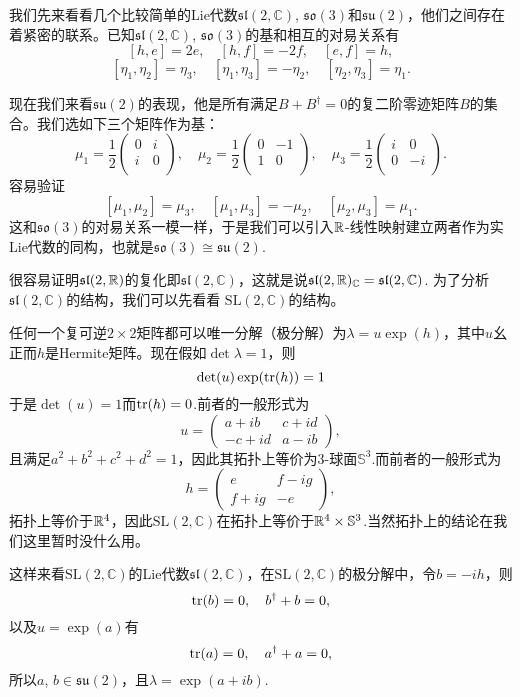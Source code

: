 \documentclass[9pt]{extarticle}
\newcommand{\cc}{\mathbb{C}}
\begin{document}
我们先来看看几个比较简单的Lie代数$\mathfrak{sl}(2,\cc)$, $\mathfrak{so}(3)$和$\mathfrak{su}(2)$，他们之间存在着紧密的联系。已知$\mathfrak{sl}(2,\cc)$, $\mathfrak{so}(3)$的基和相互的对易关系有
\[
[h,e]=2e,\quad[h,f]=-2f,\quad[e,f]=h,
\]
\[
	[\eta_1,\eta_2]=\eta_3,\quad [\eta_1,\eta_3]=-\eta_2,\quad [\eta_2,\eta_3]=\eta_1.
\]

现在我们来看$\mathfrak{su}(2)$的表现，他是所有满足$B+B^\dag=0$的复二阶零迹矩阵$B$的集合。我们选如下三个矩阵作为基：
\[
\mu_1=\frac{1}{2}\begin{pmatrix}
	0&i\\
	i&0\\
\end{pmatrix},\quad
\mu_2=\frac{1}{2}\begin{pmatrix}
	0&-1\\
	1&0\\
\end{pmatrix},\quad
\mu_3=\frac{1}{2}\begin{pmatrix}
	i&0\\
	0&-i\\
\end{pmatrix}.
\]
容易验证
\[
	[\mu_1,\mu_2]=\mu_3,\quad [\mu_1,\mu_3]=-\mu_2,\quad [\mu_2,\mu_3]=\mu_1.
\]
这和$\mathfrak{so}(3)$的对易关系一模一样，于是我们可以引入$\mathbb{R}$-线性映射建立两者作为实Lie代数的同构，也就是$\mathfrak{so}(3)\cong \mathfrak{su}(2)$.

很容易证明$\mathfrak{sl}(2,\mathbb{R})$的复化即$\mathfrak{sl}(2,\cc)$，这就是说$\mathfrak{sl}(2,\rr)_\cc=\mathfrak{sl}(2,\cc)$. 为了分析$\mathfrak{sl}(2,\cc)$的结构，我们可以先看看
$\mathrm{SL}(2,\mathbb{C})$的结构。

任何一个复可逆$2\times 2$矩阵都可以唯一分解（极分解）为$
\lambda=u\exp(h)$，其中$u$幺正而$h$是Hermite矩阵。现在假如$\det \lambda=1$，则
\[
\det(u)\exp(\operatorname{tr}(h))=1
\]
于是$\det(u)=1$而$\operatorname{tr}(h)=0$.前者的一般形式为
\[
u=
\begin{pmatrix}
a+ib&c+id\\
-c+id&a-ib
\end{pmatrix},
\]
且满足$a^2+b^2+c^2+d^2=1$，因此其拓扑上等价为3-球面$\mathbb{S}^3$.而前者的一般形式为
\[
h=\begin{pmatrix}
e&f-ig\\
f+ig&-e
\end{pmatrix},
\]
拓扑上等价于$\mathbb{R}^4$，因此$\mathrm{SL}(2,\cc)$在拓扑上等价于$\mathbb{R}^4\times \mathbb{S}^3$.当然拓扑上的结论在我们这里暂时没什么用。

这样来看$\mathrm{SL}(2,\cc)$的Lie代数$\mathfrak{sl}(2,\mathbb{C})$，在$\mathrm{SL}(2,\cc)$的极分解中，令$b=-ih$，则
\[
\operatorname{tr}(b)=0,\quad b^\dag+b=0,
\]
以及$u=\exp(a)$有
\[
\operatorname{tr}(a)=0,\quad a^\dag+a=0,
\]
所以$a$, $b\in\mathfrak{su}(2)$，且$\lambda=\exp(a+ib)$.
\end{document}
